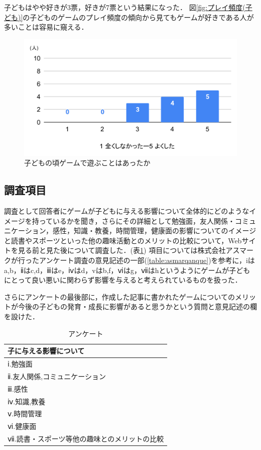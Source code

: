 \documentclass[12pt,a4j,titlepage]{ltjsarticle}
\begin{document}
子どもはやや好きが3票，好きが7票という結果になった．
図\ref{fig:プレイ頻度(子ども)}の子どものゲームのプレイ頻度の傾向から見てもゲームが好きである人が多いことは容易に窺える．

\begin{figure}[H]
 \begin{center}
  \includegraphics[keepaspectratio, scale=0.5]{chart6.pdf}
 \end{center}
 \caption{子どもの頃ゲームで遊ぶことはあったか}
 \label{fig:子どものころ}
\end{figure}

\subsection{調査項目}\label{調査項目}
調査として回答者にゲームが子どもに与える影響について全体的にどのようなイメージを持っているかを聞き，さらにその詳細として勉強面，友人関係・コミュニケーション，感性，知識・教養，時間管理，健康面の影響についてのイメージと読書やスポーツといった他の趣味活動とのメリットの比較について，Webサイトを見る前と見た後について調査した．(表\ref{table:anque})
項目については株式会社アスマークが行ったアンケート調査\cite{gameanq}の意見記述の一部(\ref{table:asmarqanque})を参考に，iはa,b，ⅱはc,d，ⅲはe，ⅳはd，vはb,f，ⅵはg，ⅶはhというようにゲームが子どもにとって良い悪いに関わらず影響を与えると考えられているものを扱った．

さらにアンケートの最後部に，作成した記事に書かれたゲームについてのメリットが今後の子どもの発育・成長に影響があると思うかという質問と意見記述の欄を設けた．

\begin{table}[H]
 \caption{アンケート}
 \label{table:anque}
 \small
 \centering
  \begin{tabular}{l}
  \hline
  子に与える影響について \\
   \hline
   ⅰ.勉強面 \\
   ⅱ.友人関係,コミュニケーション\\
   ⅲ.感性\\
   ⅳ.知識,教養 \\
   ⅴ.時間管理   \\
   ⅵ.健康面 \\
   ⅶ.読書・スポーツ等他の趣味とのメリットの比較 \\
   \hline
  \end{tabular}
\end{table}
\end{document}
